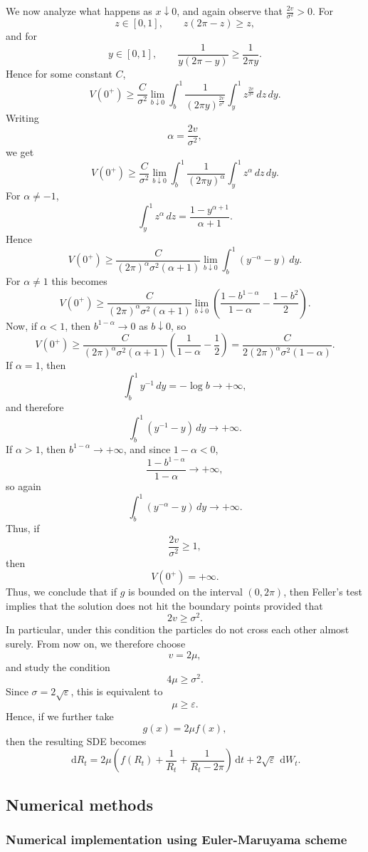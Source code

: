 \documentclass[11pt]{article}
\newcommand{\1}{\mathbbm{1}}
\newcommand{\dd}{\,\mathrm{d}}
\theoremstyle{plain}
\theoremstyle{definition}
\theoremstyle{remark}
\begin{document}
We now analyze what happens as $x\downarrow 0$, and again observe that $\frac{2v}{\sigma^2}>0$. For
\[
z \in [0, 1], \qquad z(2\pi-z) \geq z,
\]
and for
\[
y \in [0, 1], \qquad \frac{1}{y(2\pi-y)} \geq \frac{1}{2\pi y}.
\]
Hence for some constant $C$,
\[
V(0^+)\geq  \frac{C}{\sigma^2}\lim_{b\downarrow 0} \int_b^1 \frac{1}{\left(2\pi y\right)^{\frac{2v}{\sigma^2}}}\int_y^1 z^{\frac{2v}{\sigma^2}}\,dz\,dy.
\]
Writing
\[
\alpha=\frac{2v}{\sigma^2},
\]
we get
\[
V(0^+)\geq \frac{C}{\sigma^2}\lim_{b\downarrow 0}\int_b^1 \frac{1}{\left(2\pi y\right)^{\alpha}}\int_y^1 z^{\alpha}\,dz\,dy.
\]
For $\alpha\neq -1$,
\[
\int_y^1 z^{\alpha}\,dz=\frac{1-y^{\alpha+1}}{\alpha+1}.
\]
Hence
\[
V(0^+)\geq \frac{C}{(2\pi)^{\alpha}\sigma^2(\alpha+1)}
\lim_{b\downarrow 0}\int_b^1 \left(y^{-\alpha}-y\right)\,dy.
\]
For $\alpha\neq 1$ this becomes
\[
V(0^+)\geq \frac{C}{(2\pi)^{\alpha}\sigma^2(\alpha+1)}
\lim_{b\downarrow 0}
\left(
\frac{1-b^{1-\alpha}}{1-\alpha}-\frac{1-b^2}{2}
\right).
\]
Now, if $\alpha<1$, then $b^{1-\alpha}\to 0$ as $b\downarrow 0$, so
\[
V(0^+)\geq \frac{C}{(2\pi)^{\alpha}\sigma^2(\alpha+1)}
\left(
\frac{1}{1-\alpha}-\frac12
\right)
=
\frac{C}{2(2\pi)^{\alpha}\sigma^2(1-\alpha)}.
\]
If $\alpha=1$, then
\[
\int_b^1 y^{-1}\,dy=-\log b\to +\infty,
\]
and therefore
\[
\int_b^1 \left(y^{-1}-y\right)\,dy
\to +\infty.
\]
If $\alpha>1$, then $b^{1-\alpha}\to +\infty$, and since $1-\alpha<0$,
\[
\frac{1-b^{1-\alpha}}{1-\alpha}\to +\infty,
\]
so again
\[
\int_b^1 \left(y^{-\alpha}-y\right)\,dy\to +\infty.
\]
Thus, if
\[
\frac{2v}{\sigma^2}\geq 1,
\]
then
\[
V(0^+)=+\infty.
\]
Thus, we conclude that if $g$ is bounded on the interval $(0,2\pi)$, then Feller's test implies that the solution does not hit the boundary points provided that
\[
2v \geq \sigma^2.
\]
In particular, under this condition the particles do not cross each other almost surely. From now on, we therefore choose
\[
v=2\mu,
\]
and study the condition
\[
4\mu \geq \sigma^2.
\]
Since $\sigma=2\sqrt{\varepsilon}$, this is equivalent to
\[
\mu \geq \varepsilon.
\]
Hence, if we further take
\[
g(x)=2\mu f(x),
\]
then the resulting SDE becomes
\[
\dd R_t = 2\mu\left(f(R_t)+\frac{1}{R_t}+\frac{1}{R_t-2\pi}\right)\dd t + 2\sqrt{\varepsilon}\,\dd W_t.
\]
\subsection{Numerical methods} 
\label{sec:num_rep}


\subsubsection{Numerical implementation using Euler-Maruyama scheme}
\end{document}
